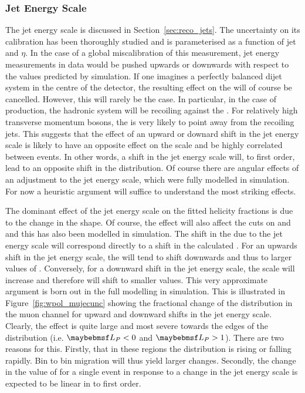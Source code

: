 \subsubsection{Jet Energy Scale}
\label{sec:wpol_syst_jec}
The jet energy scale is discussed in Section~\ref{sec:reco_jets}. The
uncertainty on its calibration has been thoroughly studied and is parameterised
as a function of jet \Pt and $\eta$. In the case of a global miscalibration of
this measurement, jet energy measurements in data would be pushed upwards or
downwards with respect to the values predicted by simulation. If one imagines a
perfectly balanced dijet system in the centre of the detector, the resulting
effect on the \METv will of course be cancelled. However, this will rarely be
the case. In particular, in the case of \Wjets production, the hadronic system
will be recoiling against the \PW. For relatively high transverse momentum \PW
bosons, the \METv is very likely to point away from the recoiling jets. This
suggests that the effect of an upward or downard shift in the jet energy scale
is likely to have an opposite effect on the \METv scale and be highly correlated
between events. In other words, a shift in the jet energy scale will, to first
order, lead to an opposite shift in the \MET distribution. Of course there are
angular effects of an adjustment to the jet energy scale, which were fully
modelled in simulation. For now a heuristic argument will suffice to understand
the most striking effects.

The dominant effect of the jet energy scale on the fitted helicity fractions is
due to the change in the \LP shape. Of course, the effect will also affect the
cuts on \PtW and \MT and this has also been modelled in simulation. The shift in
the \MET due to the jet energy scale will correspond directly to a shift in the
calculated \LP. For an upwards shift in the jet energy scale, the \MET will tend
to shift downwards and thus to larger values of \LP. Conversely, for a downward
shift in the jet energy scale, the \MET scale will increase and therefore \LP
will shift to smaller values. This very approximate argument is born out in the
full modelling in simulation. This is illustrated in
Figure~\ref{fig:wpol_mujecunc} showing the fractional change of the \LP
distribution in the muon channel for upward and downward shifts in the jet
energy scale. Clearly, the effect is quite large and most severe towards the
edges of the \LP distribution (i.e. $\LP < 0$ and $\LP > 1$). There are two
reasons for this. Firstly, that in these regions the \LP distribution is rising
or falling rapidly. Bin to bin migration will thus yield larger
changes. Secondly, the change in the value of \LP for a single event in response
to a change in the jet energy scale is expected to be linear in \LP to first
order.

